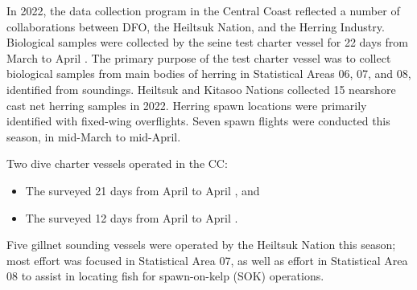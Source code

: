 In 2022, the data collection program in the Central Coast
reflected a number of collaborations between
DFO, the Heiltsuk Nation, and the Herring Industry.
Biological samples were collected by the seine test charter vessel
 for 22 days from March  to April .
The primary purpose of the test charter vessel was to
collect biological samples from main bodies of herring in
Statistical Areas 06, 07, and 08, identified from soundings.
Heiltsuk and Kitasoo Nations collected 15 nearshore
cast net herring samples in 2022.
Herring spawn locations were primarily identified with fixed-wing overflights.
Seven spawn flights were conducted this season, in mid-March to mid-April.

Two dive charter vessels operated in the CC:

\begin{itemize}

\item The  surveyed 21 days from April  to April , and

\item The  surveyed 12 days from April  to April .

\end{itemize}

Five gillnet sounding vessels were operated by the Heiltsuk Nation this season;
most effort was focused in Statistical Area 07,
as well as effort in Statistical Area 08
to assist in locating fish for spawn-on-kelp (SOK) operations.
